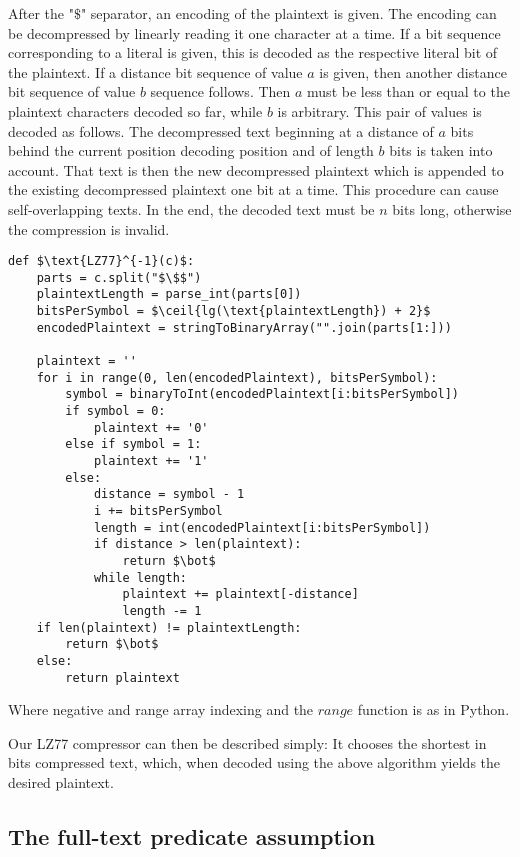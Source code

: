 \documentclass{article}
\DeclarePairedDelimiter{\ceil}{\lceil}{\rceil}
\begin{document}
After the "$\$$" separator, an encoding of the plaintext is given. The encoding
can be decompressed by linearly reading it one character at a time. If a bit sequence
corresponding to a literal
is given, this is decoded as the respective literal bit of the plaintext. If
a distance bit sequence of value $a$ is given, then another distance bit sequence of value $b$ sequence follows.
Then $a$ must be less than or equal to the plaintext characters decoded so far, while $b$
is arbitrary. This pair of values is decoded as follows. The decompressed text beginning at a distance of $a$ bits behind the current position decoding position and of length $b$ bits is taken into account. That text is then the new decompressed plaintext which is appended to the existing decompressed plaintext one bit at a time. This
procedure can cause self-overlapping texts. In the end, the decoded text must be $n$
bits long, otherwise the compression is invalid.

\begin{lstlisting}[texcl,mathescape]
def $\text{LZ77}^{-1}(c)$:
    parts = c.split("$\$$")
    plaintextLength = parse_int(parts[0])
    bitsPerSymbol = $\ceil{lg(\text{plaintextLength}) + 2}$
    encodedPlaintext = stringToBinaryArray("".join(parts[1:]))

    plaintext = ''
    for i in range(0, len(encodedPlaintext), bitsPerSymbol):
        symbol = binaryToInt(encodedPlaintext[i:bitsPerSymbol])
        if symbol = 0:
            plaintext += '0'
        else if symbol = 1:
            plaintext += '1'
        else:
            distance = symbol - 1
            i += bitsPerSymbol
            length = int(encodedPlaintext[i:bitsPerSymbol])
            if distance > len(plaintext):
                return $\bot$
            while length:
                plaintext += plaintext[-distance]
                length -= 1
    if len(plaintext) != plaintextLength:
        return $\bot$
    else:
        return plaintext
\end{lstlisting}

Where negative and range array indexing and the $range$ function is as in Python.

Our LZ77 compressor can then be described simply: It chooses the shortest
in bits compressed text, which, when decoded
using the above algorithm yields the desired plaintext.


\subsection{The full-text predicate assumption}
\end{document}
